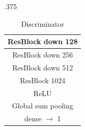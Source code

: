 \documentclass{article}
\begin{document}
\begin{table}[ht]
\begin{subtable}{.375\textwidth}
{\begin{tabular}{c}
                  ResBlock down 128\\
                  \midrule
                  ResBlock down 256\\
                  \midrule
                  ResBlock down 512\\
                  \midrule
                  ResBlock 1024\\
                  \midrule
                  ReLU\\
                  \midrule
                  Global sum pooling\\
                  \midrule
                  dense $\rightarrow$ 1 \\
                  \midrule
                  \bottomrule
              \end{tabular}}
              \caption{Discriminator}
          \end{subtable}
\end{table}
\end{document}
